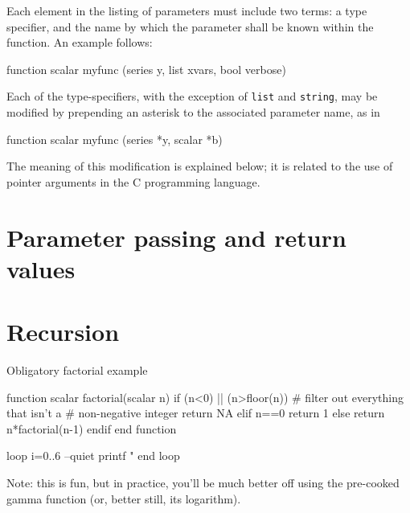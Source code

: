Each element in the listing of parameters must include two terms: a
type specifier, and the name by which the parameter shall be known
within the function.  An example follows:
%    
\begin{code}
function scalar myfunc (series y, list xvars, bool verbose)
\end{code}

Each of the type-specifiers, with the exception of \texttt{list} and
\texttt{string}, may be modified by prepending an asterisk to the
associated parameter name, as in
%    
\begin{code}
function scalar myfunc (series *y, scalar *b)
\end{code}

The meaning of this modification is explained below; it is related to
the use of pointer arguments in the C programming language.


\section{Parameter passing and return values}
\label{sec:params-returns}



\section{Recursion}

Obligatory factorial example
\begin{code}
function scalar factorial(scalar n)
    if (n<0) || (n>floor(n))
        # filter out everything that isn't a 
        # non-negative integer
        return NA
    elif n==0
        return 1
    else
        return n*factorial(n-1)
    endif
end function

loop i=0..6 --quiet
    printf "%
end loop
\end{code}

Note: this is fun, but in practice, you'll be much better off using
the pre-cooked gamma function (or, better still, its logarithm).

